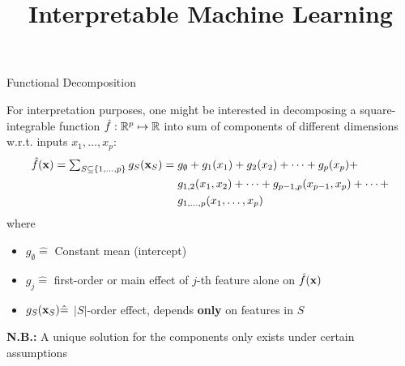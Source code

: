 \documentclass[11pt,compress,t,notes=noshow, aspectratio=169, xcolor=table]{beamer}
\title{Interpretable Machine Learning}
\date{}
\newcommand{\open}{}
\newcommand{\close}{}
\begin{document}
\newcommand{\titlefigure}{figure/open_blackbox}
\newcommand{\learninggoals}{
\item What are additive decomposition of prediction functions?
\item Why are they useful?
\item How do we obtain them?}

 
\begin{frame}{Functional Decomposition
}

For interpretation purposes, one might be interested in decomposing a square-integrable function $\fh: \mathbb{R}^p \mapsto \mathbb{R}$ into sum of components of different dimensions w.r.t. inputs $x_1, \ldots, x_p$: %
\begin{equation*}
\begin{split}
\fh(\xv) =  %
\textstyle\sum_{S \subseteq \{1,\ldots,p\}} g_{S}(\xv_S) = \; & g_{\open \emptyset \close} + g_{\open 1 \close}(x_1) + g_{\open 2 \close}(x_2) + \dots + g_{\open p \close}(x_p) + \\
& g_{\open 1, 2 \close}(x_1, x_2) + \dots + g_{\open p-1, p \close}(x_{p-1}, x_p) + \dots + \\
& g_{\open 1,\ldots,p \close}(x_1, \ldots, x_p)
\end{split}
\end{equation*}
where 
\begin{itemize}
\item $g_{\open \emptyset \close} \hat = $ Constant mean (intercept) %
\item $g_{\open j \close} \hat = $ first-order or main effect of $j$-th feature alone on $\fh(\xv)$
\item $g_{S}(\xv_S) \hat = $ $|S|$-order effect, depends \textbf{only} on features in $S$ %
\end{itemize}
\lz
\textbf{N.B.:} %
A unique solution for the components only exists under certain assumptions


\end{frame}
\end{document}
